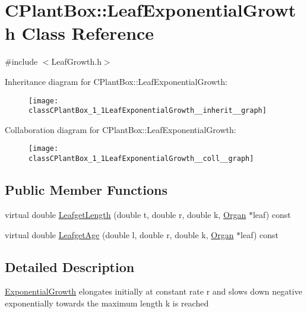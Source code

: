 \hypertarget{classCPlantBox_1_1LeafExponentialGrowth}{}\section{C\+Plant\+Box\+:\+:Leaf\+Exponential\+Growth Class Reference}
\label{classCPlantBox_1_1LeafExponentialGrowth}


{\ttfamily \#include $<$Leaf\+Growth.\+h$>$}



Inheritance diagram for C\+Plant\+Box\+:\+:Leaf\+Exponential\+Growth\+:\nopagebreak
\begin{figure}[H]
\begin{center}
\leavevmode
\texttt{[image: classCPlantBox\_1\_1LeafExponentialGrowth\_\_inherit\_\_graph]}
\end{center}
\end{figure}


Collaboration diagram for C\+Plant\+Box\+:\+:Leaf\+Exponential\+Growth\+:\nopagebreak
\begin{figure}[H]
\begin{center}
\leavevmode
\texttt{[image: classCPlantBox\_1\_1LeafExponentialGrowth\_\_coll\_\_graph]}
\end{center}
\end{figure}
\subsection*{Public Member Functions}
\begin{DoxyCompactItemize}
\item 
virtual double \hyperlink{classCPlantBox_1_1LeafExponentialGrowth_a734c28895db7e1c378d5431d712a53c9}{Leafget\+Length} (double t, double r, double k, \hyperlink{classCPlantBox_1_1Organ}{Organ} $\ast$leaf) const
\item 
virtual double \hyperlink{classCPlantBox_1_1LeafExponentialGrowth_a31eabefa43aee62945250d7a909a3cee}{Leafget\+Age} (double l, double r, double k, \hyperlink{classCPlantBox_1_1Organ}{Organ} $\ast$leaf) const
\end{DoxyCompactItemize}


\subsection{Detailed Description}
\hyperlink{classCPlantBox_1_1ExponentialGrowth}{Exponential\+Growth} elongates initially at constant rate r and slows down negative exponentially towards the maximum length k is reached 

